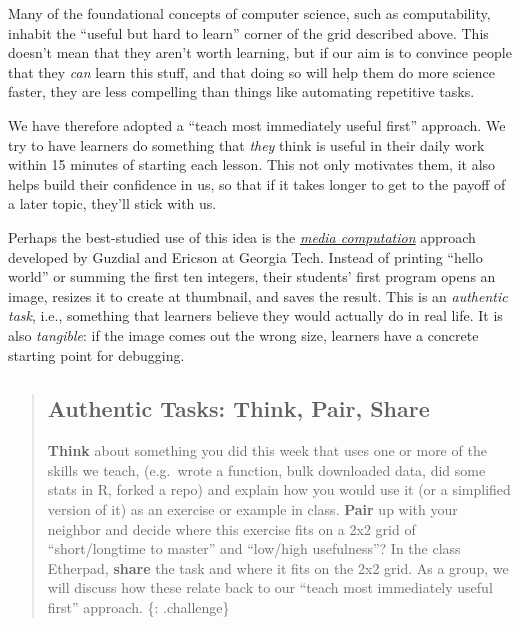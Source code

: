 Many of the foundational concepts of computer science, such as
computability, inhabit the ``useful but hard to learn'' corner of the
grid described above. This doesn't mean that they aren't worth learning,
but if our aim is to convince people that they \emph{can} learn this
stuff, and that doing so will help them do more science faster, they are
less compelling than things like automating repetitive tasks.

We have therefore adopted a ``teach most immediately useful first''
approach. We try to have learners do something that \emph{they} think is
useful in their daily work within 15 minutes of starting each lesson.
This not only motivates them, it also helps build their confidence in
us, so that if it takes longer to get to the payoff of a later topic,
they'll stick with us.

Perhaps the best-studied use of this idea is the
\emph{\href{\{\{\%20page.root\%20\}\}/files/papers/guzdial-mediacomp-retrospective-2013.pdf}{media
computation}} approach developed by Guzdial and Ericson at Georgia Tech.
Instead of printing ``hello world'' or summing the first ten integers,
their students' first program opens an image, resizes it to create at
thumbnail, and saves the result. This is an \emph{authentic task}, i.e.,
something that learners believe they would actually do in real life. It
is also \emph{tangible}: if the image comes out the wrong size, learners
have a concrete starting point for debugging.

\begin{quote}
\subsection{Authentic Tasks: Think, Pair,
Share}\label{authentic-tasks-think-pair-share}

\textbf{Think} about something you did this week that uses one or more
of the skills we teach, (e.g.~wrote a function, bulk downloaded data,
did some stats in R, forked a repo) and explain how you would use it (or
a simplified version of it) as an exercise or example in class.
\textbf{Pair} up with your neighbor and decide where this exercise fits
on a 2x2 grid of ``short/longtime to master'' and ``low/high
usefulness''? In the class Etherpad, \textbf{share} the task and where
it fits on the 2x2 grid. As a group, we will discuss how these relate
back to our ``teach most immediately useful first'' approach. \{:
.challenge\}
\end{quote}

